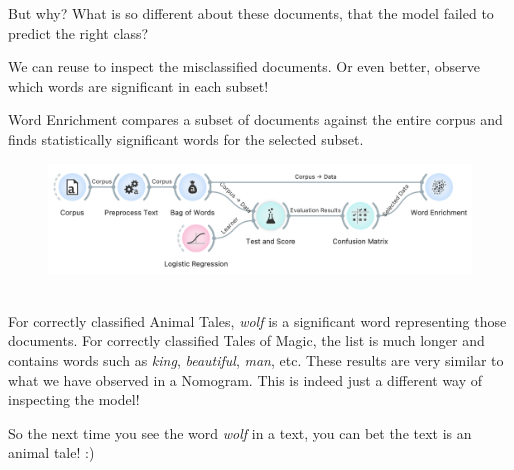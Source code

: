 But why? What is so different about these documents, that the model failed to predict the right class?

We can reuse  to inspect the misclassified documents. Or even better, observe which words are significant in each subset!

\newpage
\clearpage

Word Enrichment compares a subset of documents against the entire corpus and finds statistically significant words for the selected subset.

\vspace{-0.2cm}
\begin{figure}[h]
  \centering
  \includegraphics[width=\linewidth]{workflow2.png}%
  \caption{$\;$}
\end{figure}
\vspace{-0.3cm}

For correctly classified Animal Tales, \emph{wolf} is a significant word representing those documents. For correctly classified Tales of Magic, the list is much longer and contains words such as \emph{king}, \emph{beautiful}, \emph{man}, etc. These results are very similar to what we have observed in a Nomogram. This is indeed just a different way of inspecting the model!

So the next time you see the word \emph{wolf} in a text, you can bet the text is an animal tale! :)

